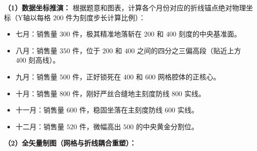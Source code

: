 \textbf{（1）数据坐标推演：}
根据题意和图表，计算各个月份对应的折线锚点绝对物理坐标（Y轴以每格 $200$ 件为刻度步长计算比例）：
\begin{itemize}
    \item 七月：销售量 $300$ 件，极其精准地落斩在 $200$ 和 $400$ 刻度的中央基准面。
    \item 八月：销售量 $350$ 件，位于 $200$ 和 $400$ 之间的四分之三偏高段（贴近上方 $400$ 刻高线）。
    \item 九月：销售量 $500$ 件，正好锁死在 $400$ 和 $600$ 网格腔体的正核心。
    \item 十月：销售量 $800$ 件，刚好严丝合缝地主刻度防线 $800$ 实线。
    \item 十一月：销售量 $600$ 件，稳固坐落在主刻度防线 $600$ 实线。
    \item 十二月：销售量 $520$ 件，微幅高出 $500$ 的中央黄金分割位。
\end{itemize}

\textbf{（2）全矢量制图（网格与折线耦合重塑）：}

